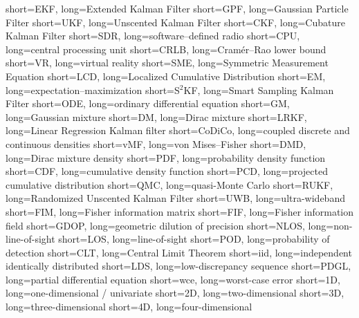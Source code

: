 		{short={EKF},	    	    long={Extended Kalman Filter}}
		{short={GPF},	    	long={Gaussian Particle Filter}}
		{short={UKF},	    	    long={Unscented Kalman Filter}}
		{short={CKF},	    	long={Cubature Kalman Filter}}
		{short={SDR},	    	    long={software--defined radio}}
		{short={CPU},	    	    long={central processing unit}}
		{short={CRLB},	    	  long={Cramér--Rao lower bound}}
		  {short={VR},	    	    long={virtual reality}}
		{short={SME},	    	    long={Symmetric Measurement Equation}}
		{short={LCD},	    	    long={Localized Cumulative Distribution}}
	    {short={EM},	    	    long={expectation--maximization}}
	  {short={S$^2$KF},	      long={Smart Sampling Kalman Filter}}
	  {short={ODE},	    	    long={ordinary differential equation}}
	    {short={GM},	    	    long={Gaussian mixture}}
	    {short={DM},	    	    long={Dirac mixture}}
	  {short={LRKF},	    	  long={Linear Regression Kalman filter}}
	{short={CoDiCo},	      long={coupled discrete and continuous densities}} 
		{short={vMF},	    	    long={von Mises--Fisher}}
		{short={DMD},	    	    long={Dirac mixture density}}
		{short={PDF},	    	    long={probability density function}}
		{short={CDF},	    	    long={cumulative density function}}
		{short={PCD},	    	    long={projected cumulative distribution}}
		{short={QMC},	    	    long={quasi-Monte Carlo}}
		{short={RUKF},	    	  long={Randomized Unscented Kalman Filter}}
		{short={UWB},	    	    long={ultra-wideband}}
		{short={FIM},	    	    long={Fisher information matrix}}
		{short={FIF},	    	    long={Fisher information field}}
		{short={GDOP},	    	  long={geometric dilution of precision}}
		{short={NLOS},	    	  long={non-line-of-sight}}
		{short={LOS},	    	    long={line-of-sight}}
		{short={POD},	    	    long={probability of detection}}
		{short={CLT},	    	    long={Central Limit Theorem}}
		{short={iid},	    	long={independent identically distributed}}
		{short={LDS},	    	long={low-discrepancy sequence}}
		{short={PDGL},	    	long={partial differential equation}}
		{short={wce},	    	long={worst-case error}}
		    {short={1D},	    	long={one-dimensional / univariate}}
		    {short={2D},	    	long={two-dimensional}}
		    {short={3D},	    	long={three-dimensional}}
		    {short={4D},	    	long={four-dimensional}}





